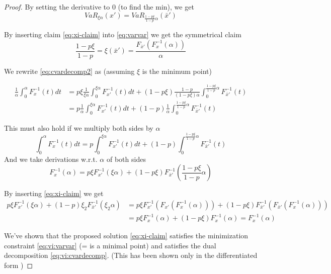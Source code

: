 \begin{proof}
By setting the derivative to 0 (to find the min), we get
\begin{equation}\label{eq:vi:varvar}
VaR_{\xi\alpha}(x')= VaR_{\frac{1-p\xi}{1-p}\alpha}(\bar{x}')
\end{equation}

By inserting claim \ref{eq:xi-claim} into \ref{eq:varvar} we get the symmetrical claim
\begin{equation}
\dfrac{1-p\xi}{1-p} = \xi(\bar{x}') = \dfrac{F_{\bar{x}'}(F^{-1}_x(\alpha))}{\alpha}
\end{equation}

We rewrite \ref{eq:cvardecomp2} as (assuming $\xi$ is the minimum point)

\begin{equation}
\begin{split}
\frac{1}{\alpha} \int_0^\alpha F^{-1}_{x}(t)dt &= p\xi \frac{1}{\xi\alpha} \int_0^{\xi\alpha} F^{-1}_{x'}(t)dt + (1-p\xi)\frac{1-p}{(1-p\xi)\alpha} \int_0^{\frac{1-p\xi}{1-p}\alpha} F^{-1}_{\bar{x}'}(t)\\
&=p \frac{1}{\alpha} \int_0^{\xi\alpha} F^{-1}_{x'}(t)dt + (1-p)\frac{1}{\alpha} \int_0^{\frac{1-p\xi}{1-p}\alpha} F^{-1}_{\bar{x}'}(t)
\end{split}
\end{equation}

This must also hold if we multiply both sides by $\alpha$
\begin{equation}
\int_0^\alpha F^{-1}_{x}(t)dt = p\int_0^{\xi\alpha} F^{-1}_{x'}(t)dt + (1-p)\int_0^{\frac{1-p\xi}{1-p}\alpha} F^{-1}_{\bar{x}'}(t)
\end{equation}
And we take derivations w.r.t. $\alpha$ of both sides
\begin{equation}
F^{-1}_{x}(\alpha) = p\xi F^{-1}_{x'}(\xi\alpha) + (1-p\xi) F^{-1}_{\bar{x}'}(\frac{1-p\xi}{1-p}\alpha)
\end{equation}


By inserting \ref{eq:xi-claim} we get
\begin{equation}
\begin{split}
 p\xi F_{x'}^{-1}(\xi\alpha) + (1-p)\xi_2 F_{\bar{x}'}^{-1}\left(\xi_2\alpha\right) &= p\xi F_{x'}^{-1}(F_{x'}(F^{-1}_x(\alpha))) + (1-p\xi) F_{\bar{x}'}^{-1}\left(F_{\bar{x}'}(F^{-1}_x(\alpha))\right)\\
 &= p\xi F_x^{-1}(\alpha) + (1-p\xi)F_x^{-1}(\alpha) = F_x^{-1}(\alpha)
\end{split}
\end{equation}

We've shown that the proposed solution \ref{eq:xi-claim} satisfies the minimization constraint \ref{eq:vi:varvar} (= is a minimal point) and satisfies the dual decomposition \ref{eq:vi:cvardecomp}. (This has been shown only in the differentiated form )

\end{proof}



